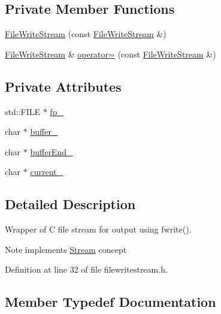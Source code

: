 \subsection*{Private Member Functions}
\begin{DoxyCompactItemize}
\item 
\mbox{\hyperlink{classrapidjson_1_1_file_write_stream_a4c3e7e34c9c31ba4dfc03da6bfde0302}{File\+Write\+Stream}} (const \mbox{\hyperlink{classrapidjson_1_1_file_write_stream}{File\+Write\+Stream}} \&)
\item 
\mbox{\hyperlink{classrapidjson_1_1_file_write_stream}{File\+Write\+Stream}} \& \mbox{\hyperlink{classrapidjson_1_1_file_write_stream_a13bc77bf3da09dbb7f3f2c9229a01bda}{operator=}} (const \mbox{\hyperlink{classrapidjson_1_1_file_write_stream}{File\+Write\+Stream}} \&)
\end{DoxyCompactItemize}
\subsection*{Private Attributes}
\begin{DoxyCompactItemize}
\item 
std\+::\+F\+I\+LE $\ast$ \mbox{\hyperlink{classrapidjson_1_1_file_write_stream_a2feb4173ac3aa7a32c7e01bd42e3ffeb}{fp\+\_\+}}
\item 
char $\ast$ \mbox{\hyperlink{classrapidjson_1_1_file_write_stream_a6f69951e2b3ae4819383e9b949e1166c}{buffer\+\_\+}}
\item 
char $\ast$ \mbox{\hyperlink{classrapidjson_1_1_file_write_stream_afc6c60e519e8b58ec7fd9930aa8e41eb}{buffer\+End\+\_\+}}
\item 
char $\ast$ \mbox{\hyperlink{classrapidjson_1_1_file_write_stream_a250f94025fad330db98c97da9d3967a6}{current\+\_\+}}
\end{DoxyCompactItemize}


\subsection{Detailed Description}
Wrapper of C file stream for output using fwrite(). 

\begin{DoxyNote}{Note}
implements \mbox{\hyperlink{classrapidjson_1_1_stream}{Stream}} concept 
\end{DoxyNote}


Definition at line 32 of file filewritestream.\+h.



\subsection{Member Typedef Documentation}
\mbox{\label{classrapidjson_1_1_file_write_stream_afc606cc81f6c3709d81bf99b30566330}} 
